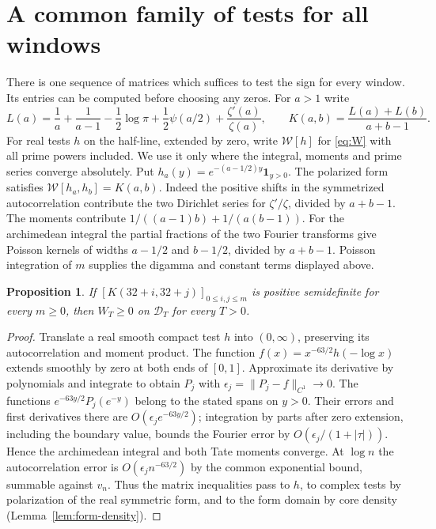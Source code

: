 \documentclass[10pt]{amsart}
\newtheorem{proposition}[theorem]{Proposition}
\theoremstyle{definition}
\theoremstyle{remark}
\begin{document}
\section{A common family of tests for all windows}\label{sec:ladder}
There is one sequence of matrices which suffices to test the sign for every
window. Its entries can be computed before choosing any zeros. For $a>1$
write
\[
 L(a)=\frac1a+\frac1{a-1}-\frac12\log\pi+
 \frac12\psi(a/2)+\frac{\zeta'(a)}{\zeta(a)},\qquad
 K(a,b)=\frac{L(a)+L(b)}{a+b-1}.
\]
For real tests $h$ on the half-line, extended by zero, write $\mathcal W[h]$
for \eqref{eq:W} with all prime powers included. We use it only where
the integral, moments and prime series converge absolutely. Put
$h_a(y)=e^{-(a-1/2)y}\mathbf1_{y>0}$. The polarized form satisfies
$\mathcal W[h_a,h_b]=K(a,b)$. Indeed the positive shifts
in the symmetrized autocorrelation contribute the two Dirichlet series for
$\zeta'/\zeta$, divided by $a+b-1$. The moments contribute
$1/((a-1)b)+1/(a(b-1))$. For the archimedean integral the partial fractions
of the two Fourier transforms give Poisson kernels of widths $a-1/2$ and
$b-1/2$, divided by $a+b-1$. Poisson integration of $m$ supplies the
digamma and constant terms displayed above.

\begin{proposition}\label{ladder}
If $[K(32+i,32+j)]_{0\le i,j\le m}$ is positive semidefinite for every
$m\ge0$, then $W_T\ge0$ on $\mathcal D_T$ for every $T>0$.
\end{proposition}
\begin{proof}
Translate a real smooth compact test $h$ into $(0,\infty)$, preserving its
autocorrelation and moment product. The function $f(x)=x^{-63/2}h(-\log x)$
extends smoothly by zero at both ends of $[0,1]$. Approximate its derivative
by polynomials and integrate to obtain $P_j$ with $\epsilon_j=\|P_j-f\|_{C^1}\to0$.
The functions $e^{-63y/2}P_j(e^{-y})$ belong to the stated spans on $y>0$.
Their errors and first derivatives there are $O(\epsilon_j e^{-63y/2})$;
integration by parts after zero extension, including the boundary value,
bounds the Fourier error by $O(\epsilon_j/(1+|\tau|))$. Hence the
archimedean integral and both Tate moments converge. At $\log n$ the
autocorrelation error is $O(\epsilon_j n^{-63/2})$ by the common exponential
bound, summable against $v_n$. Thus the matrix inequalities pass to $h$,
to complex tests by polarization of the real symmetric form, and to the
form domain by core density (Lemma~\ref{lem:form-density}).
\end{proof}
\end{document}
